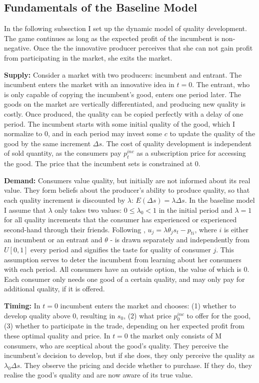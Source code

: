 \documentclass[13pt]{article}
\numberwithin{figure}{section}
\numberwithin{table}{section}
\theoremstyle{indented}
\numberwithin{equation}{section} %
\begin{document}
\subsection{Fundamentals of the Baseline Model}
In the following subsection I set up the dynamic model of quality development. The game continues as long as the expected profit of the incumbent is non-negative. Once the the innovative producer perceives that she can not gain profit from participating in the market, she exits the market.

\textbf{Supply:}
Consider a market with two producers: incumbent and entrant. The incumbent enters the market with an innovative idea in $t=0$. The entrant, who is only capable of copying the incumbent's good, enters one period later. The goods on the market are vertically differentiated, and producing new quality is costly. Once produced, the quality can be copied perfectly with a delay of one period. The incumbent starts with some initial quality of the good, which I normalize to 0, and in each period may invest some $c$ to update the quality of the good by the same increment $\Delta s$. The cost of quality development is independent of sold quantity, as the consumers pay $p_t^{inc}$ as a subscription price for accessing the good. The price that the incumbent sets is constrained at 0.

\textbf{Demand:} Consumers value quality, but initially are not informed about its real value. They form beliefs about the producer's ability to produce quality, so that each quality increment is discounted by $\lambda$: $E(\Delta s) = \lambda \Delta s$. In the baseline model I assume that $\lambda$ only takes two values: $0\leq\lambda_0 <1$ in the initial period and $\lambda=1$ for all quality increments that the consumer has experienced or experienced second-hand through their friends. Following \citet{Tirole},  $u_j = \lambda \theta_j s_t - p_{ti}$, where $i$ is either an incumbent or an entrant and $\theta$ - is drawn separately and independently from $U[0,1]$ every period and signifies the taste for quality of consumer $j$. This assumption serves to deter the incumbent from learning about her consumers with each period. All consumers have an outside option, the value of which is 0. Each consumer only needs one good of a certain quality, and may only pay for additional quality, if it is offered.

\textbf{Timing:} 
In $t=0$ incumbent enters the market and chooses: (1) whether to develop quality above 0, resulting in $s_0$, (2) what price $p_0^{inc}$ to offer for the good, (3) whether to participate in the trade, depending on her expected profit from these optimal quality and price. In $t=0$ the market only consists of M consumers, who are sceptical about the good's quality. They perceive the incumbent's decision to develop, but if she does, they only perceive the quality as $\lambda_0 \Delta s$. They observe the pricing and decide whether to purchase. If they do, they realise the good's quality and are now aware of its true value.
\end{document}
